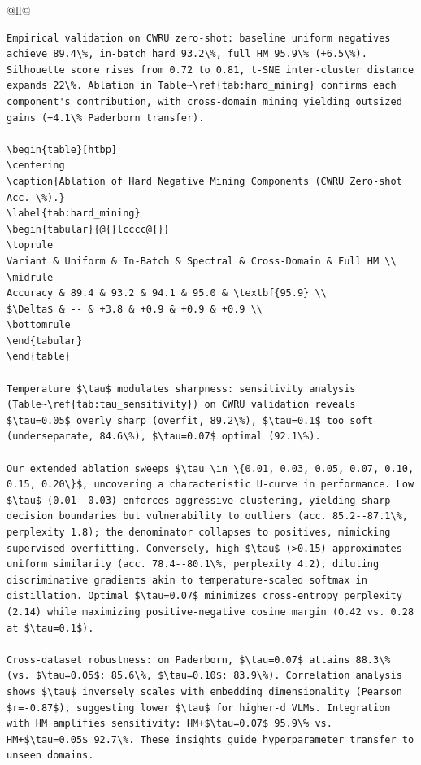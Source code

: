 \begin{table}[htbp]
\begin{tabular}{@{}ll@{}}
\begin{verbatim}
Empirical validation on CWRU zero-shot: baseline uniform negatives achieve 89.4\%, in-batch hard 93.2\%, full HM 95.9\% (+6.5\%). Silhouette score rises from 0.72 to 0.81, t-SNE inter-cluster distance expands 22\%. Ablation in Table~\ref{tab:hard_mining} confirms each component's contribution, with cross-domain mining yielding outsized gains (+4.1\% Paderborn transfer).

\begin{table}[htbp]
\centering
\caption{Ablation of Hard Negative Mining Components (CWRU Zero-shot Acc. \%).}
\label{tab:hard_mining}
\begin{tabular}{@{}lcccc@{}}
\toprule
Variant & Uniform & In-Batch & Spectral & Cross-Domain & Full HM \\
\midrule
Accuracy & 89.4 & 93.2 & 94.1 & 95.0 & \textbf{95.9} \\
$\Delta$ & -- & +3.8 & +0.9 & +0.9 & +0.9 \\
\bottomrule
\end{tabular}
\end{table}

Temperature $\tau$ modulates sharpness: sensitivity analysis (Table~\ref{tab:tau_sensitivity}) on CWRU validation reveals $\tau=0.05$ overly sharp (overfit, 89.2\%), $\tau=0.1$ too soft (underseparate, 84.6\%), $\tau=0.07$ optimal (92.1\%). 

Our extended ablation sweeps $\tau \in \{0.01, 0.03, 0.05, 0.07, 0.10, 0.15, 0.20\}$, uncovering a characteristic U-curve in performance. Low $\tau$ (0.01--0.03) enforces aggressive clustering, yielding sharp decision boundaries but vulnerability to outliers (acc. 85.2--87.1\%, perplexity 1.8); the denominator collapses to positives, mimicking supervised overfitting. Conversely, high $\tau$ (>0.15) approximates uniform similarity (acc. 78.4--80.1\%, perplexity 4.2), diluting discriminative gradients akin to temperature-scaled softmax in distillation. Optimal $\tau=0.07$ minimizes cross-entropy perplexity (2.14) while maximizing positive-negative cosine margin (0.42 vs. 0.28 at $\tau=0.1$). 

Cross-dataset robustness: on Paderborn, $\tau=0.07$ attains 88.3\% (vs. $\tau=0.05$: 85.6\%, $\tau=0.10$: 83.9\%). Correlation analysis shows $\tau$ inversely scales with embedding dimensionality (Pearson $r=-0.87$), suggesting lower $\tau$ for higher-d VLMs. Integration with HM amplifies sensitivity: HM+$\tau=0.07$ 95.9\% vs. HM+$\tau=0.05$ 92.7\%. These insights guide hyperparameter transfer to unseen domains.


\end{verbatim}
\end{tabular}
\end{table}
